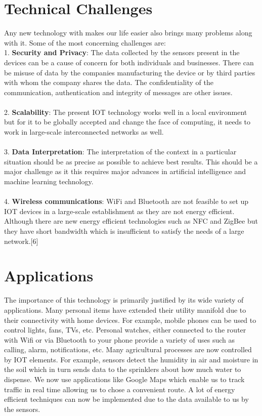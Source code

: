 \documentclass[conference]{IEEEtran}
\begin{document}
\section{Technical Challenges}
Any new technology with makes our life easier also brings many problems along with it. Some of the most concerning challenges are:\\
1. \textbf{Security and Privacy}: The data collected by the sensors present in the devices can be a cause of concern for both individuals and businesses. There can be misuse of data by the companies manufacturing the device or by third parties with whom the company shares the data. The confidentiality of the communication, authentication and integrity of messages are other issues.\\\\
2. \textbf{Scalability}: The present IOT technology works well in a local environment but for it to be globally accepted and change the face of computing, it needs to work in large-scale interconnected networks as well.\\\\
3. \textbf{Data Interpretation}: The interpretation of the context in a particular situation should be as precise as possible to achieve best results. This should be a major challenge as it this requires major advances in artificial intelligence and machine learning technology.\\\\
4. \textbf{Wireless communications}: WiFi and Bluetooth are not feasible to set up IOT devices in a large-scale establishment as they are not energy efficient. Although there are new energy efficient technologies such as NFC and ZigBee but they have short bandwidth which is insufficient to satisfy the needs of a large network.[6] 


\section{Applications}
The importance of this technology is primarily justified by its wide variety of applications. Many personal items have extended their utility manifold due to their connectivity with home devices. For example, mobile phones can be used to control lights, fans, TVs, etc. Personal watches, either connected to the router with Wifi or via Bluetooth to your phone provide a variety of uses such as calling, alarm, notifications, etc. Many agricultural processes are now controlled by IOT elements. For example, sensors detect the humidity in air and moisture in the soil which in turn sends data to the sprinklers about how much water to dispense. We now use applications like Google Maps which enable us to track traffic in real time allowing us to chose a convenient route. A lot of energy efficient techniques can now be implemented due to the data available to us by the sensors.
\end{document}
